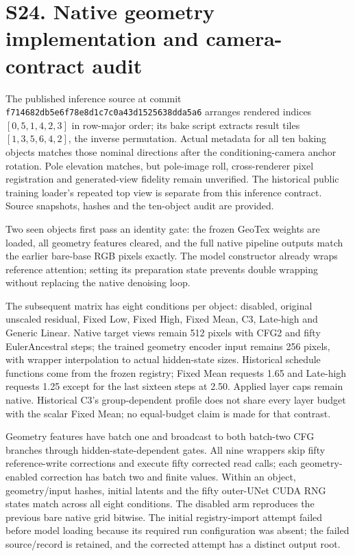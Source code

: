 \documentclass[11pt]{article}
\begin{document}
\section*{S24. Native geometry implementation and camera-contract audit}
The published inference source at commit \texttt{f714682db5e6f78e8d1c7c0a43d1525638dda5a6} arranges rendered indices $[0,5,1,4,2,3]$ in row-major order; its bake script extracts result tiles $[1,3,5,6,4,2]$, the inverse permutation. Actual metadata for all ten baking objects matches those nominal directions after the conditioning-camera anchor rotation. Pole elevation matches, but pole-image roll, cross-renderer pixel registration and generated-view fidelity remain unverified. The historical public training loader's repeated top view is separate from this inference contract. Source snapshots, hashes and the ten-object audit are provided.

Two seen objects first pass an identity gate: the frozen GeoTex weights are loaded, all geometry features cleared, and the full native pipeline outputs match the earlier bare-base RGB pixels exactly. The model constructor already wraps reference attention; setting its preparation state prevents double wrapping without replacing the native denoising loop.

The subsequent matrix has eight conditions per object: disabled, original unscaled residual, Fixed Low, Fixed High, Fixed Mean, C3, Late-high and Generic Linear. Native target views remain 512 pixels with CFG2 and fifty EulerAncestral steps; the trained geometry encoder input remains 256 pixels, with wrapper interpolation to actual hidden-state sizes. Historical schedule functions come from the frozen registry; Fixed Mean requests 1.65 and Late-high requests 1.25 except for the last sixteen steps at 2.50. Applied layer caps remain native. Historical C3's group-dependent profile does not share every layer budget with the scalar Fixed Mean; no equal-budget claim is made for that contrast.

Geometry features have batch one and broadcast to both batch-two CFG branches through hidden-state-dependent gates. All nine wrappers skip fifty reference-write corrections and execute fifty corrected read calls; each geometry-enabled correction has batch two and finite values. Within an object, geometry/input hashes, initial latents and the fifty outer-UNet CUDA RNG states match across all eight conditions. The disabled arm reproduces the previous bare native grid bitwise. The initial registry-import attempt failed before model loading because its required run configuration was absent; the failed source/record is retained, and the corrected attempt has a distinct output root.
\end{document}
